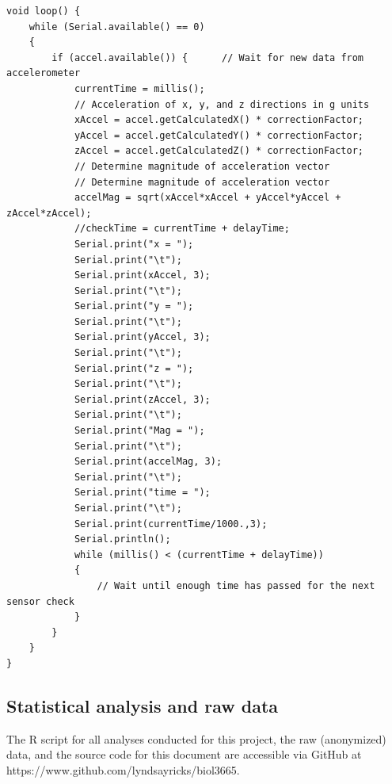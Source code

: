 \documentclass{article}
\begin{document}
\begin{lstlisting}
void loop() {
    while (Serial.available() == 0) 
    {
        if (accel.available()) {      // Wait for new data from accelerometer
            currentTime = millis();
            // Acceleration of x, y, and z directions in g units
            xAccel = accel.getCalculatedX() * correctionFactor;
            yAccel = accel.getCalculatedY() * correctionFactor;
            zAccel = accel.getCalculatedZ() * correctionFactor; 
            // Determine magnitude of acceleration vector
            // Determine magnitude of acceleration vector
            accelMag = sqrt(xAccel*xAccel + yAccel*yAccel + zAccel*zAccel);
            //checkTime = currentTime + delayTime;
            Serial.print("x = ");
            Serial.print("\t");
            Serial.print(xAccel, 3);
            Serial.print("\t");
            Serial.print("y = ");
            Serial.print("\t");
            Serial.print(yAccel, 3);
            Serial.print("\t");
            Serial.print("z = ");
            Serial.print("\t");
            Serial.print(zAccel, 3);
            Serial.print("\t");
            Serial.print("Mag = ");
            Serial.print("\t");
            Serial.print(accelMag, 3);
            Serial.print("\t");
            Serial.print("time = ");
            Serial.print("\t");
            Serial.print(currentTime/1000.,3);
            Serial.println();
            while (millis() < (currentTime + delayTime))
            {
                // Wait until enough time has passed for the next sensor check
            }
        }
    }
}
\end{lstlisting}

\subsection{Statistical analysis and raw data}
The R script for all analyses conducted for this project, the raw (anonymized) data, and the source code for this document are accessible via GitHub at https://www.github.com/lyndsayricks/biol3665.
\end{document}
